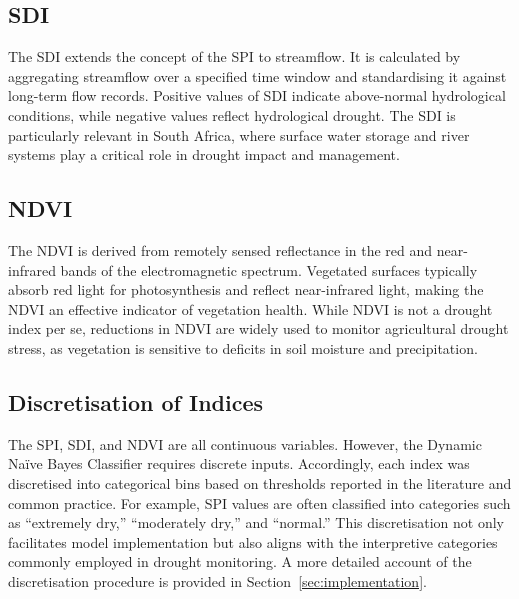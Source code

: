\subsection{SDI}

The SDI extends the concept of the SPI to streamflow. It is calculated by aggregating streamflow over a specified time window and standardising it against long-term flow records. Positive values of SDI indicate above-normal hydrological conditions, while negative values reflect hydrological drought. The SDI is particularly relevant in South Africa, where surface water storage and river systems play a critical role in drought impact and management.

\subsection{NDVI}

The NDVI is derived from remotely sensed reflectance in the red and near-infrared bands of the electromagnetic spectrum. Vegetated surfaces typically absorb red light for photosynthesis and reflect near-infrared light, making the NDVI an effective indicator of vegetation health. While NDVI is not a drought index per se, reductions in NDVI are widely used to monitor agricultural drought stress, as vegetation is sensitive to deficits in soil moisture and precipitation.

\subsection{Discretisation of Indices}

The SPI, SDI, and NDVI are all continuous variables. However, the Dynamic Naïve Bayes Classifier requires discrete inputs. Accordingly, each index was discretised into categorical bins based on thresholds reported in the literature and common practice. For example, SPI values are often classified into categories such as “extremely dry,” “moderately dry,” and “normal.” This discretisation not only facilitates model implementation but also aligns with the interpretive categories commonly employed in drought monitoring. A more detailed account of the discretisation procedure is provided in Section~\ref{sec:implementation}.

